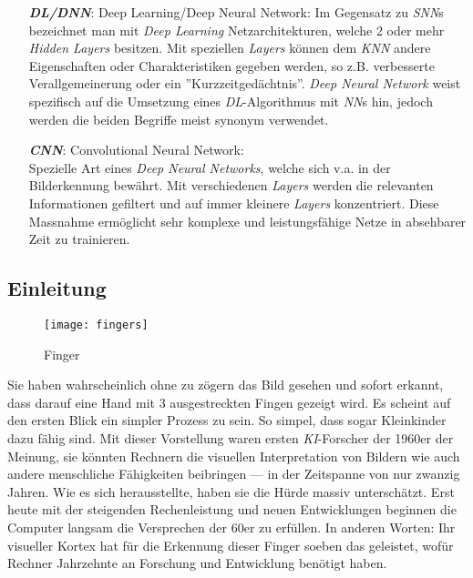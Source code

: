 \begin{itemize}[leftmargin=2cm]
	\item[\textbf{\textit{DL/DNN}}:] Deep Learning/Deep Neural Network:
	Im Gegensatz zu \textit{SNN}s bezeichnet man mit \textit{Deep Learning} Netzarchitekturen, welche 2 oder mehr \textit{Hidden Layers} besitzen. Mit speziellen \textit{Layers} können dem \textit{KNN} andere Eigenschaften oder Charakteristiken gegeben werden, so z.B. verbesserte Verallgemeinerung oder ein ''Kurzzeitgedächtnis''. \textit{Deep Neural Network} weist spezifisch auf die Umsetzung eines \textit{DL}-Algorithmus mit \textit{NN}s hin, jedoch werden die beiden Begriffe meist synonym verwendet\cite{dl}.
	
	\item[\textbf{\textit{CNN}}:] Convolutional Neural Network:\\
	 Spezielle Art eines \textit{Deep Neural Networks}, welche sich v.a. in der Bilderkennung bewährt. Mit verschiedenen \textit{Layers} werden die relevanten Informationen gefiltert und auf immer kleinere \textit{Layers} konzentriert. Diese Massnahme ermöglicht sehr komplexe und leistungsfähige Netze in absehbarer Zeit zu trainieren.
	
\end{itemize}

\newpage

\subsection{Einleitung}


\begin{figure}[h]
	\centering
	\texttt{[image: fingers]}
	\caption[Finger, https://img.livestrongcdn.com/, 2017, Artikel 541001]{Finger}
\end{figure}

Sie haben wahrscheinlich ohne zu zögern das Bild gesehen und sofort erkannt, dass darauf eine Hand mit 3 ausgestreckten Fingen gezeigt wird. Es scheint auf den ersten Blick ein simpler Prozess zu sein. So simpel, dass sogar Kleinkinder dazu fähig sind. Mit dieser Vorstellung waren ersten \textit{KI}-Forscher der 1960er der Meinung, sie könnten Rechnern die visuellen Interpretation von Bildern wie auch andere menschliche Fähigkeiten beibringen --- in der Zeitspanne von nur zwanzig Jahren. Wie es sich herausstellte, haben sie die Hürde massiv unterschätzt. Erst heute mit der steigenden Rechenleistung und neuen Entwicklungen beginnen die Computer langsam die Versprechen der 60er zu erfüllen. In anderen Worten: Ihr visueller Kortex hat für die Erkennung dieser Finger soeben das geleistet, wofür Rechner Jahrzehnte an Forschung und Entwicklung benötigt haben.\\

